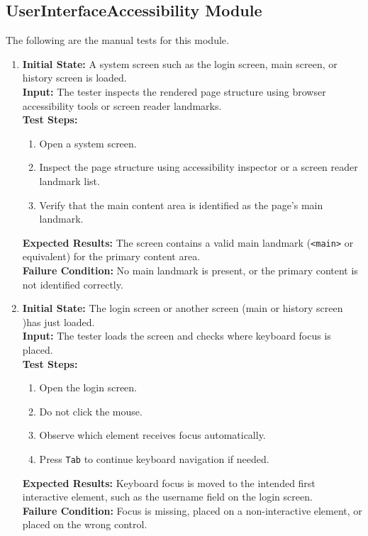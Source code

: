 \documentclass[12pt, titlepage]{article}
\begin{document}
\subsection{UserInterfaceAccessibility Module}
The following are the manual tests for this module.

\begin{enumerate}[label=UIA-MT \arabic*., wide=0pt, leftmargin=*]
  \item{}
    {\bf Initial State:} A system screen such as the login screen,
    main screen, or history screen is loaded. \\
    {\bf Input:} The tester inspects the rendered page structure
    using browser accessibility tools or screen reader landmarks. \\
    {\bf Test Steps:}
    \begin{enumerate}
      \item Open a system screen.
      \item Inspect the page structure using accessibility inspector
        or a screen reader landmark list.
      \item Verify that the main content area is identified as the
        page's main landmark.
    \end{enumerate}
    {\bf Expected Results:} The screen contains a valid main landmark
    ({\tt <main>} or equivalent) for the primary content area. \\
    {\bf Failure Condition:} No main landmark is present, or the
    primary content is not identified correctly. \\

  \item{}
    {\bf Initial State:} The login screen or another screen (main or
    history screen )has just loaded. \\
    {\bf Input:} The tester loads the screen and checks where
    keyboard focus is placed. \\
    {\bf Test Steps:}
    \begin{enumerate}
      \item Open the login screen.
      \item Do not click the mouse.
      \item Observe which element receives focus automatically.
      \item Press {\tt Tab} to continue keyboard navigation if needed.
    \end{enumerate}
    {\bf Expected Results:} Keyboard focus is moved to the intended
    first interactive element, such as the username field on the
    login screen. \\
    {\bf Failure Condition:} Focus is missing, placed on a
    non-interactive element, or placed on the wrong control. \\


\end{enumerate}
\end{document}
